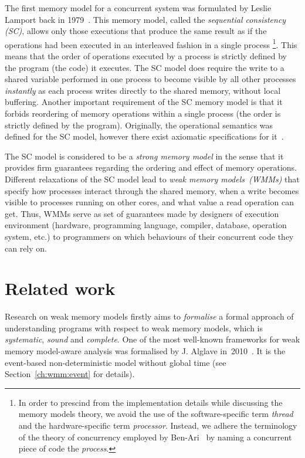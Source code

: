 The first memory model for a concurrent system was formulated by Leslie Lamport back in 1979~\cite{lamport1979make}.
This memory model, called the \textit{sequential consistency (SC)}, allows only those executions that produce the same result as if the operations had been executed in an interleaved fashion in a single process%
%
\footnote{In order to prescind from the implementation details while discussing the memory models theory, we avoid the use of the software-specific term \textit{thread} and the hardware-specific term \textit{processor}. Instead, we adhere the terminology of the theory of concurrency employed by Ben-Ari~\cite{ben2006principles} by naming a concurrent piece of code the \textit{process}.}. %
%
This means that the order of operations executed by a process is strictly defined by the program (the code) it executes.
The SC model does require the write to a shared variable performed in one process to become visible by all other processes \textit{instantly} as each process writes directly to the shared memory, without local buffering.
Another important requirement of the SC memory model is that it forbids reordering of memory operations within a single process (the order is strictly defined by the program).
Originally, the operational semantics was defined for the SC model, however there exist axiomatic specifications for it~\cite{mansky2015axiomatic}.

The SC model is considered to be a \textit{strong memory model} in the sense that it provides firm guarantees regarding the ordering and effect of memory operations.
Different relaxations of the SC model lead to \textit{weak memory models~(WMMs)} that specify how processes interact through the shared memory, when a write becomes visible to processes running on other cores, and what value a read operation can get.
Thus, WMMs serve as set of guarantees made by designers of execution environment (hardware, programming language, compiler, database, operation system, etc.) to programmers on which behaviours of their concurrent code they can rely on.


\section{Related work}
\label{ch:intro:related}

Research on weak memory models firstly aims to \textit{formalise} a formal approach of understanding programs with respect to weak memory models, which is \textit{systematic}, \textit{sound} and \textit{complete}.
One of the most well-known frameworks for weak memory model-aware analysis was formalised by J. Alglave in~2010~\cite{alglave2010shared}.
It is the event-based non-deterministic model without global time (see Section~\ref{ch:wmm:event} for details).

